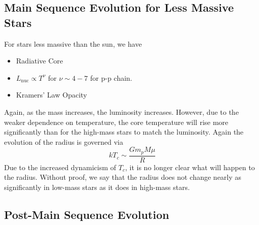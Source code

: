 \documentclass[10pt]{article}
\numberwithin{equation}{section}
\begin{document}
    \subsection{Main Sequence Evolution for Less Massive Stars}
    \label{sec:main-sequ-evol-1}

    For stars less massive than the sun, we have
    \begin{itemize}
    \item Radiative Core
    \item $L_{\mathrm{nuc}}\propto T^\nu$ for $\nu\sim 4-7$ for p-p
      chain.
      \item Kramers' Law Opacity
    \end{itemize}
    Again, as the mass increases, the luminosity increases. However,
    due to the weaker dependence on temperature, the core temperature
    will rise more significantly than for the high-mass stars to match
    the luminosity. Again the evolution of the radius is governed via
    \begin{equation}
      \label{eq:239}
      kT_c\sim\frac{Gm_pM\mu}{R}
    \end{equation}
    Due to the increased dynamicism of $T_c$, it is no longer clear
    what will happen to the radius. Without proof, we say that the
    radius does not change nearly as significantly in low-mass stars
    as it does in high-mass stars.

    \subsection{Post-Main Sequence Evolution}
    \label{sec:post-main-sequence}
\end{document}
